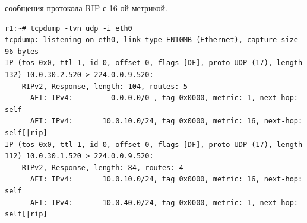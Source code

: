\documentclass[a4paper,12pt]{article}
\begin{document}
сообщения протокола RIP с 16-ой метрикой.
\begin{Verbatim}
r1:~# tcpdump -tvn udp -i eth0
tcpdump: listening on eth0, link-type EN10MB (Ethernet), capture size 96 bytes
IP (tos 0x0, ttl 1, id 0, offset 0, flags [DF], proto UDP (17), length 132) 10.0.30.2.520 > 224.0.0.9.520: 
	RIPv2, Response, length: 104, routes: 5
	  AFI: IPv4:         0.0.0.0/0 , tag 0x0000, metric: 1, next-hop: self
	  AFI: IPv4:       10.0.10.0/24, tag 0x0000, metric: 16, next-hop: self[|rip]
IP (tos 0x0, ttl 1, id 0, offset 0, flags [DF], proto UDP (17), length 112) 10.0.30.1.520 > 224.0.0.9.520: 
	RIPv2, Response, length: 84, routes: 4
	  AFI: IPv4:       10.0.10.0/24, tag 0x0000, metric: 16, next-hop: self
	  AFI: IPv4:       10.0.40.0/24, tag 0x0000, metric: 1, next-hop: self[|rip]

\end{Verbatim}
\end{document}
